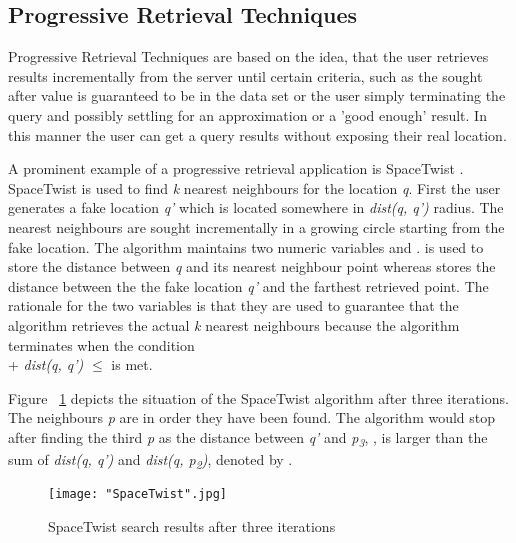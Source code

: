 \documentclass[english]{tktltiki2}
\theoremstyle{definition}
\theoremstyle{remark}
\begin{document}
\subsection{Progressive Retrieval Techniques}

Progressive Retrieval Techniques are based on the idea, that the user retrieves results incrementally from the server until certain criteria, such as the sought after value is guaranteed to be in the data set or the user simply terminating the query and possibly settling for an approximation or a 'good enough' result. In this manner the user can get a query results without exposing their real location. \par

A prominent example of a progressive retrieval application is SpaceTwist \cite{SpaceTwist}. SpaceTwist is used to find \textit{k} nearest neighbours for the location \textit{q}. First the user generates a fake location \textit{q'} which is located somewhere in \textit{dist(q, q')} radius. The nearest neighbours are sought incrementally in a growing circle starting from the fake location. The algorithm maintains two numeric variables \textgamma \hspace{1mm} and \texttau. \textgamma \hspace{1mm} is used to store the distance between \textit{q} and its nearest neighbour point whereas \texttau \hspace{1mm} stores the distance between the the fake location \textit{q'} and the farthest retrieved point. The rationale for the two variables is that they are used to guarantee that the algorithm retrieves the actual \textit{k} nearest neighbours because the algorithm terminates when the condition \\ \textgamma \hspace{1mm} + \textit{dist(q, q')} \( \leq \) \texttau \hspace{1mm} is met. \par 

Figure ~\ref{fig:SpaceTwist} depicts the situation of the SpaceTwist algorithm after three iterations. The neighbours \textit{p} are in order they have been found. The algorithm would stop after finding the third \textit{p} as the distance between \textit{q'} and \textit{p\textsubscript{3}}, \texttau, is larger than the sum of \textit{dist(q, q')} and \textit{dist(q, p\textsubscript{2})}, denoted by \textgamma.

\begin{figure}[ht!]
\centering
{}
\texttt{[image: "SpaceTwist".jpg]}
\caption{SpaceTwist search results after three iterations}
\label{fig:SpaceTwist}
\end{figure} 
\end{document}
